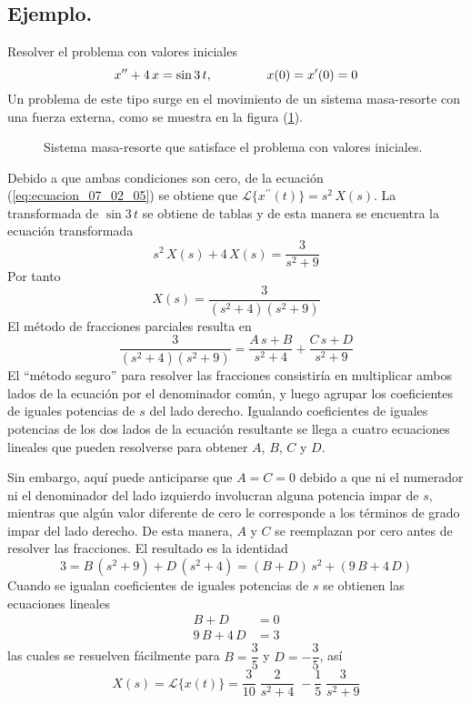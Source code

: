 \subsection*{Ejemplo.}
Resolver el problema con valores iniciales
\[ x^{\prime \prime} + 4 \, x =  \sin 3 \, t, \hspace{1.5cm} x(0) = x^{\prime}(0) = 0 \]
Un problema de este tipo surge en el movimiento de un sistema masa-resorte con una fuerza externa, como se muestra en la figura (\ref{fig:figura_002}).
\begin{figure}[H]
    \centering
    
    \caption{Sistema masa-resorte que satisface el problema con valores iniciales.}
    \label{fig:figura_002}
\end{figure}
Debido a que ambas condiciones son cero, de la ecuación (\ref{eq:ecuacion_07_02_05}) se obtiene que $\mathscr{L} \{x^{\prime \prime} (t) \} = s^{2} \, X(s) $. La transformada de $\sin 3 \, t$ se obtiene de tablas y de esta manera se encuentra la ecuación transformada
\[ s^{2} \, X(s) + 4 \, X(s) = \dfrac{3}{s^{2} + 9} \]
Por tanto
\[ X(s) = \dfrac{3}{(s^{2} + 4)(s^{2} + 9)} \]
El método de fracciones parciales resulta en
\[ \dfrac{3}{(s^{2} + 4)(s^{2} + 9)} = \dfrac{A \, s + B}{s^{2} + 4} + \dfrac{C \, s +D}{s^{2} + 9} \]
El \enquote{método seguro} para resolver las fracciones consistiría en multiplicar ambos lados de la ecuación por el denominador común, y luego agrupar los coeficientes de iguales potencias de $s$ del lado derecho. Igualando coeficientes de iguales potencias de los dos lados de la ecuación resultante se llega a cuatro ecuaciones lineales que pueden resolverse para obtener $A$, $B$, $C$ y $D$.
\par
Sin embargo, aquí puede anticiparse que $A = C = 0$ debido a que ni el numerador ni el denominador del lado izquierdo involucran alguna potencia impar de $s$, mientras que algún valor diferente de cero le corresponde a los términos de grado impar del lado derecho. De esta manera, $A$ y $C$ se reemplazan por cero antes de resolver las fracciones. El resultado es la identidad
\[ 3 = B \, (s^{2} + 9) + D \, (s^{2} + 4) =  (B + D) \, s^{2} + (9 \, B + 4 \, D) \]
Cuando se igualan coeficientes de iguales potencias de $s$ se obtienen las ecuaciones lineales
\begin{align*}
B + D &= 0 \\
9 \, B + 4 \, D &= 3
\end{align*}
las cuales se resuelven fácilmente para $B = \dfrac{3}{5}$ y $D = - \dfrac{3}{5}$, así
\[ X(s) = \mathscr{L} \{x(t) \} = \dfrac{3}{10} \; \dfrac{2}{s^{2} + 4} \; - \dfrac{1}{5} \; \dfrac{3}{s^{2} + 9} \]
